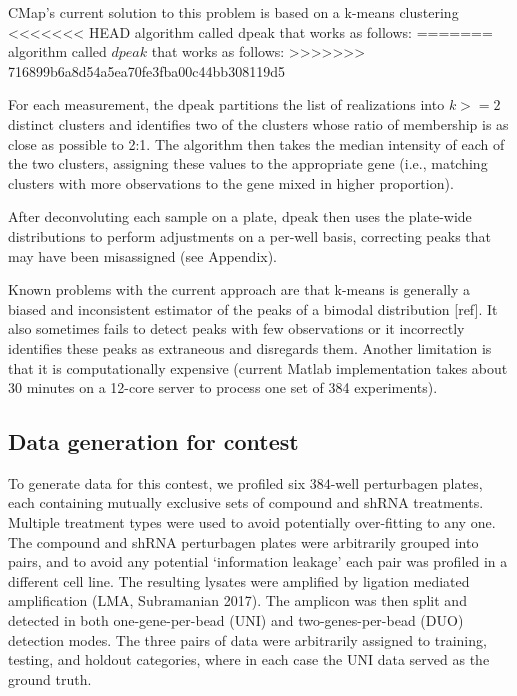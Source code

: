 \documentclass[]{article}
\begin{document}
CMap's current solution to this problem is based on a k-means clustering
<<<<<<< HEAD
algorithm called dpeak that works as follows:
=======
algorithm called \(dpeak\) that works as follows:
>>>>>>> 716899b6a8d54a5ea70fe3fba00c44bb308119d5

For each measurement, the dpeak partitions the list of realizations into
\(k>=2\) distinct clusters and identifies two of the clusters whose
ratio of membership is as close as possible to 2:1. The algorithm then
takes the median intensity of each of the two clusters, assigning these
values to the appropriate gene (i.e., matching clusters with more
observations to the gene mixed in higher proportion).

After deconvoluting each sample on a plate, dpeak then uses the
plate-wide distributions to perform adjustments on a per-well basis,
correcting peaks that may have been misassigned (see Appendix).

Known problems with the current approach are that k-means is generally a
biased and inconsistent estimator of the peaks of a bimodal distribution
{[}ref{]}. It also sometimes fails to detect peaks with few observations
or it incorrectly identifies these peaks as extraneous and disregards
them. Another limitation is that it is computationally expensive
(current Matlab implementation takes about 30 minutes on a 12-core
server to process one set of 384 experiments).

\hypertarget{data-generation-for-contest}{%
\subsection{Data generation for
contest}\label{data-generation-for-contest}}

To generate data for this contest, we profiled six 384-well perturbagen
plates, each containing mutually exclusive sets of compound and shRNA
treatments. Multiple treatment types were used to avoid potentially
over-fitting to any one. The compound and shRNA perturbagen plates were
arbitrarily grouped into pairs, and to avoid any potential `information
leakage' each pair was profiled in a different cell line. The resulting
lysates were amplified by ligation mediated amplification (LMA,
Subramanian 2017). The amplicon was then split and detected in both
one-gene-per-bead (UNI) and two-genes-per-bead (DUO) detection modes.
The three pairs of data were arbitrarily assigned to training, testing,
and holdout categories, where in each case the UNI data served as the
ground truth.
\end{document}
